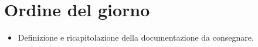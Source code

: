 \section{Ordine del giorno}

\begin{itemize}
    \item Definizione e ricapitolazione della documentazione da consegnare.
\end{itemize}